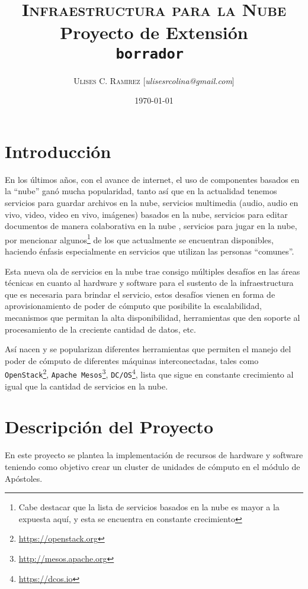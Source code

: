 \documentclass{article}
\title{\textsc{Infraestructura para la Nube}\\Proyecto de Extensión\\{\tt borrador }}
\author{\textsc{Ulises C. Ramirez} [\textit{ulisesrcolina@gmail.com}]}
\date{\today}
\begin{document}
\maketitle
\tableofcontents

\section{Introducción}%
\label{sec:introduccion}
En los últimos años, con el avance de internet, el uso de componentes basados
en la ``nube'' ganó
mucha popularidad, tanto así que en la actualidad tenemos servicios para
guardar archivos en la nube\cite{m-19, m-20, m-21},
servicios multimedia (audio\cite{m-1, m-2, m-3, m-4},
audio en vivo\cite{m-22},
video\cite{m-5, m-6, m-7},
video en vivo\cite{m-8},
imágenes\cite{m-9, m-10, m-11}) basados en la nube,
servicios para editar documentos de manera colaborativa en la nube
\cite{m-12, m-13, m-14, m-15},
servicios para jugar en la nube\cite{m-16, m-17, m-18}, por mencionar
algunos\footnote{Cabe destacar que la lista de servicios basados en la nube es
mayor a la expuesta aquí, y esta se encuentra en constante crecimiento}
de los que actualmente se encuentran disponibles, haciendo énfasis especialmente
en servicios que utilizan las personas ``comunes''.

Esta nueva ola de servicios
en la nube trae consigo múltiples desafíos en las áreas técnicas en cuanto al
hardware y software para el sustento de la infraestructura que es necesaria
para brindar el servicio, estos desafíos vienen en forma de aprovisionamiento
de poder de cómputo que posibilite la escalabilidad, mecanismos que permitan la
alta disponibilidad, herramientas que den soporte al procesamiento de la
creciente cantidad de datos, etc.

Así nacen y se popularizan diferentes herramientas que permiten el manejo del
poder de cómputo de diferentes máquinas interconectadas, tales como
\texttt{OpenStack}\footnote{\url{https://openstack.org}}, \texttt{Apache
Mesos}\footnote{ \url{http://mesos.apache.org}  },
\texttt{DC/OS}\footnote{ \url{https://dcos.io}  }, lista que sigue en constante
crecimiento al igual que la cantidad de servicios en la nube.



\section{Descripción del Proyecto}%
\label{sec:descripcion_del_proyecto}
En este proyecto se plantea la implementación de recursos de hardware y
software teniendo como objetivo crear un cluster de unidades de cómputo en el
módulo de Apóstoles.
\end{document}
